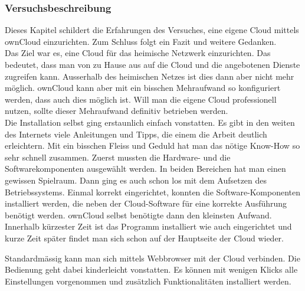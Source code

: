 \subsubsection{Versuchsbeschreibung}
Dieses Kapitel schildert die Erfahrungen des Versuches, eine eigene Cloud mittels ownCloud einzurichten. Zum Schluss folgt ein Fazit und weitere Gedanken.
\\
Das Ziel war es, eine Cloud für das heimische Netzwerk einzurichten. Das bedeutet, dass man von zu Hause aus auf die Cloud und die angebotenen Dienste zugreifen kann. Ausserhalb des heimischen Netzes ist dies dann aber nicht mehr möglich. ownCloud kann aber mit ein bisschen Mehraufwand so konfiguriert werden, dass auch dies möglich ist. Will man die eigene Cloud professionell nutzen, sollte dieser Mehraufwand definitiv betrieben werden.
\\
Die Installation selbst ging erstaunlich einfach vonstatten. Es gibt in den weiten des Internets viele Anleitungen und Tipps, die einem die Arbeit deutlich erleichtern. Mit ein bisschen Fleiss und Geduld hat man das nötige Know-How so sehr schnell zusammen. Zuerst mussten die Hardware- und die Softwarekomponenten ausgewählt werden. In beiden Bereichen hat man einen gewissen Spielraum. Dann ging es auch schon los mit dem Aufsetzen des Betriebssystems. Einmal korrekt eingerichtet, konnten die Software-Komponenten installiert werden, die neben der Cloud-Software für eine korrekte Ausführung benötigt werden. ownCloud selbst benötigte dann den kleinsten Aufwand. Innerhalb kürzester Zeit ist das Programm installiert wie auch eingerichtet und kurze Zeit später findet man sich schon auf der Hauptseite der Cloud wieder.

Standardmässig kann man sich mittels Webbrowser mit der Cloud verbinden. Die Bedienung geht dabei kinderleicht vonstatten. Es können mit wenigen Klicks alle Einstellungen vorgenommen und zusätzlich Funktionalitäten installiert werden. 


